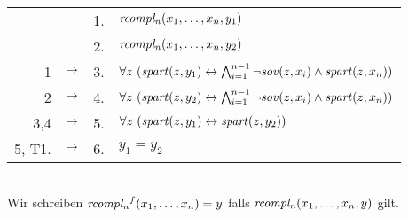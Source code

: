 \begin{bew}\ \\
    \begin{longtable}{r c c l}
        & & 1. & $\mathit{rcompl_{n}}(x_{1},\ldots,x_{n},y_1)$\\
        & & 2. & $\mathit{rcompl_{n}}(x_{1},\ldots,x_{n},y_2)$\\
        1 & $\rightarrow$ & 3. & $\forall z\ (\Gspart(z,y_1)
        \leftrightarrow \bigwedge^{n-1}_{i=1} \neg\Gsov(z,x_{i}) \wedge \Gspart(z, x_{n}))$\\
        2 & $\rightarrow$ & 4. & $\forall z\ (\Gspart(z,y_2)
        \leftrightarrow \bigwedge^{n-1}_{i=1} \neg\Gsov(z,x_{i}) \wedge \Gspart(z, x_{n}))$ \\
        3,4 & $\rightarrow$ & 5. & $\forall z\ (\Gspart(z,y_1) \leftrightarrow \Gspart(z,y_2))$ \\
        5, T1. & $\rightarrow$ & 6. & $y_1 = y_2$
    \end{longtable}
\end{bew}

\begin{konv}\ \\
    Wir schreiben $\mathit{rcompl_{n}}^f(x_{1},\ldots,x_{n}) = y$ falls $\mathit{rcompl_{n}}(x_{1},\ldots,x_{n},y)$ gilt.
\end{konv}



